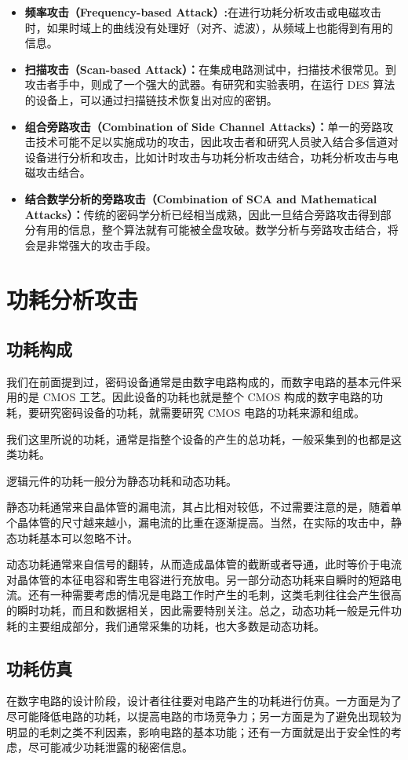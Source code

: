 \begin{itemize}
\item \textbf{频率攻击（Frequency-based Attack）:}在进行功耗分析攻击或电磁攻击时，如果时域上的曲线没有处理好（对齐、滤波），从频域上也能得到有用的信息。
\item \textbf{扫描攻击（Scan-based Attack）：}在集成电路测试中，扫描技术很常见。到攻击者手中，则成了一个强大的武器。有研究和实验表明，在运行 DES 算法的设备上，可以通过扫描链技术恢复出对应的密钥。
\item \textbf{组合旁路攻击（Combination of Side Channel Attacks）：}单一的旁路攻击技术可能不足以实施成功的攻击，因此攻击者和研究人员驶入结合多信道对设备进行分析和攻击，比如计时攻击与功耗分析攻击结合，功耗分析攻击与电磁攻击结合。
\item \textbf{结合数学分析的旁路攻击（Combination of SCA and Mathematical Attacks）：}传统的密码学分析已经相当成熟，因此一旦结合旁路攻击得到部分有用的信息，整个算法就有可能被全盘攻破。数学分析与旁路攻击结合，将会是非常强大的攻击手段。

\end{itemize}


\section{功耗分析攻击}

\subsection{功耗构成}  %
我们在前面提到过，密码设备通常是由数字电路构成的，而数字电路的基本元件采用的是 CMOS 工艺。因此设备的功耗也就是整个 CMOS 构成的数字电路的功耗，要研究密码设备的功耗，就需要研究 CMOS 电路的功耗来源和组成。

我们这里所说的功耗，通常是指整个设备的产生的总功耗，一般采集到的也都是这类功耗。

逻辑元件的功耗一般分为静态功耗和动态功耗。

静态功耗通常来自晶体管的漏电流，其占比相对较低，不过需要注意的是，随着单个晶体管的尺寸越来越小，漏电流的比重在逐渐提高。当然，在实际的攻击中，静态功耗基本可以忽略不计。

动态功耗通常来自信号的翻转，从而造成晶体管的截断或者导通，此时等价于电流对晶体管的本征电容和寄生电容进行充放电。另一部分动态功耗来自瞬时的短路电流。还有一种需要考虑的情况是电路工作时产生的毛刺，这类毛刺往往会产生很高的瞬时功耗，而且和数据相关，因此需要特别关注。总之，动态功耗一般是元件功耗的主要组成部分，我们通常采集的功耗，也大多数是动态功耗。 \cite{paa_cn}

\subsection{功耗仿真}  %
在数字电路的设计阶段，设计者往往要对电路产生的功耗进行仿真。一方面是为了尽可能降低电路的功耗，以提高电路的市场竞争力；另一方面是为了避免出现较为明显的毛刺之类不利因素，影响电路的基本功能；还有一方面就是出于安全性的考虑，尽可能减少功耗泄露的秘密信息。


